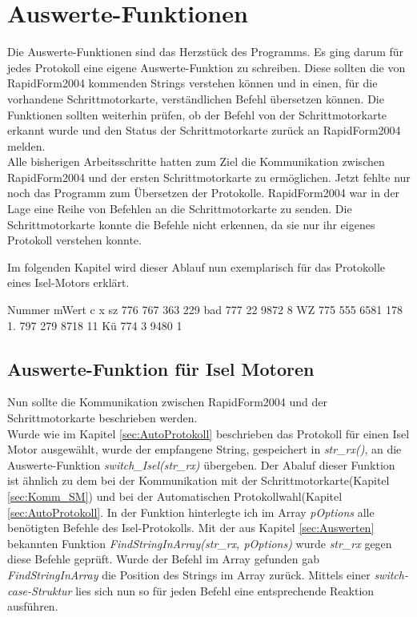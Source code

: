 \lstset{language=C, basicstyle=\footnotesize, showstringspaces=false, tabsize=8}


\lstset{language=C, basicstyle=\footnotesize, showstringspaces=false, tabsize=8}


\section{Auswerte-Funktionen}

Die Auswerte-Funktionen sind das Herzstück des Programms. Es ging darum für jedes Protokoll eine eigene Auswerte-Funktion zu schreiben. Diese sollten die von RapidForm2004 kommenden Strings verstehen können und in einen, für die vorhandene Schrittmotorkarte, verständlichen Befehl übersetzen können. Die Funktionen sollten weiterhin prüfen, ob der Befehl von der Schrittmotorkarte erkannt wurde und den Status der Schrittmotorkarte zurück an RapidForm2004 melden.\\


Alle bisherigen Arbeitsschritte hatten zum Ziel die Kommunikation zwischen RapidForm2004 und der ersten Schrittmotorkarte zu ermöglichen. Jetzt fehlte nur noch das Programm zum Übersetzen der Protokolle. 
RapidForm2004 war in der Lage eine Reihe von Befehlen an die Schrittmotorkarte zu senden. Die Schrittmotorkarte konnte die Befehle nicht erkennen, da sie nur ihr eigenes Protokoll verstehen konnte.




Im folgenden Kapitel wird dieser Ablauf nun exemplarisch für das Protokolle eines Isel-Motors erklärt.


Nummer			mWert		c			x			
sz 776			767			363			229
bad 777			22			9872		8
WZ 775			555			6581		178
1. 797			279			8718		11
Kü	774			3			9480		1			



\subsection{Auswerte-Funktion für Isel Motoren}
Nun sollte die Kommunikation zwischen RapidForm2004 und der Schrittmotorkarte beschrieben werden.\\
Wurde wie im Kapitel \ref{sec:AutoProtokoll} beschrieben das Protokoll für einen Isel Motor ausgewählt, wurde der empfangene String, gespeichert in \emph{str\_rx()}, an die Auswerte-Funktion \emph{switch\_Isel(str\_rx)} übergeben. Der Abaluf dieser Funktion ist ähnlich zu dem bei der Kommunikation mit der Schrittmotorkarte(Kapitel \ref{sec:Komm_SM}) und bei der Automatischen Protokollwahl(Kapitel \ref{sec:AutoProtokoll}. In der Funktion hinterlegte ich im Array \emph{pOptions} alle benötigten Befehle des Isel-Protokolls. Mit der aus Kapitel \ref{sec:Auswerten} bekannten Funktion \emph{FindStringInArray(str\_rx, pOptions)} wurde \emph{str\_rx} gegen diese Befehle geprüft. Wurde der Befehl im Array gefunden gab \emph{FindStringInArray} die Position des Strings im Array zurück. Mittels einer \emph{switch-case-Struktur} lies sich nun so für jeden Befehl eine entsprechende Reaktion ausführen. 

